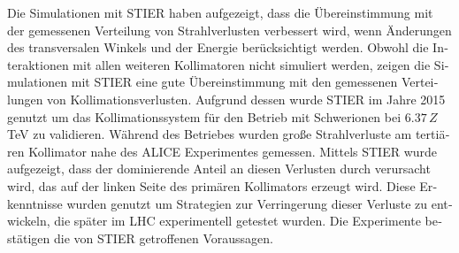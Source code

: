 \begin{otherlanguage}{german}
Die Simulationen mit STIER haben aufgezeigt, dass die \"{U}bereinstimmung mit der gemessenen Verteilung von Strahlverlusten verbessert wird, wenn \"{A}nderungen des transversalen Winkels und der Energie ber\"{u}cksichtigt werden. Obwohl die Interaktionen mit allen weiteren Kollimatoren nicht simuliert werden, zeigen die Simulationen mit  STIER eine gute \"{U}bereinstimmung mit den gemessenen Verteilungen von Kollimationsverlusten. Aufgrund dessen wurde STIER im Jahre 2015 genutzt um das \mbox{Kollimationssystem} f\"{u}r den Betrieb mit \lead Schwerionen bei $6.37\,Z\,$TeV zu validieren. W\"{a}hrend des Betriebes wurden gro\ss e Strahlverluste am terti\"{a}ren Kollimator nahe des ALICE Experimentes gemessen. Mittels STIER wurde aufgezeigt, dass der dominierende Anteil an diesen Verlusten durch  verursacht wird, das auf der linken Seite des prim\"{a}ren Kollimators erzeugt wird. Diese Erkenntnisse wurden genutzt um Strategien zur Verringerung dieser Verluste zu entwickeln, die sp\"{a}ter im LHC experimentell getestet wurden. Die Experimente best\"{a}tigen die von STIER getroffenen Voraussagen.
\vspace{0.2cm}



\thispagestyle{plain}

\newpage


\end{otherlanguage}
